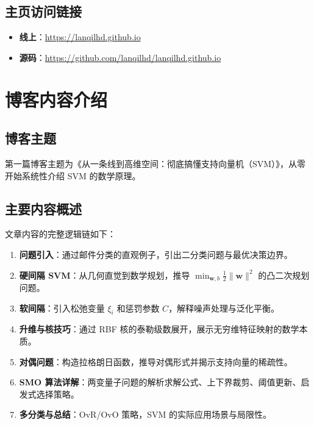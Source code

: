 \documentclass[12pt, a4paper]{article}
\begin{document}
\subsection{主页访问链接}
\begin{itemize}
    \item \textbf{线上}：\href{https://lanqilhd.github.io}{https://lanqilhd.github.io}
    \item \textbf{源码}：\href{https://github.com/lanqilhd/lanqilhd.github.io}{https://github.com/lanqilhd/lanqilhd.github.io}
\end{itemize}

\section{博客内容介绍}

\subsection{博客主题}

第一篇博客主题为《从一条线到高维空间：彻底搞懂支持向量机（SVM）》，从零开始系统性介绍 SVM 的数学原理。

\subsection{主要内容概述}

文章内容的完整逻辑链如下：

\begin{enumerate}[leftmargin=*]
    \item \textbf{问题引入}：通过邮件分类的直观例子，引出二分类问题与最优决策边界。
    \item \textbf{硬间隔 SVM}：从几何直觉到数学规划，推导 $\min_{\mathbf{w},b} \frac{1}{2}\|\mathbf{w}\|^2$ 的凸二次规划问题。
    \item \textbf{软间隔}：引入松弛变量 $\xi_i$ 和惩罚参数 $C$，解释噪声处理与泛化平衡。
    \item \textbf{升维与核技巧}：通过 RBF 核的泰勒级数展开，展示无穷维特征映射的数学本质。
    \item \textbf{对偶问题}：构造拉格朗日函数，推导对偶形式并揭示支持向量的稀疏性。
    \item \textbf{SMO 算法详解}：两变量子问题的解析求解公式、上下界裁剪、阈值更新、启发式选择策略。
    \item \textbf{多分类与总结}：OvR/OvO 策略，SVM 的实际应用场景与局限性。
\end{enumerate}
\end{document}
